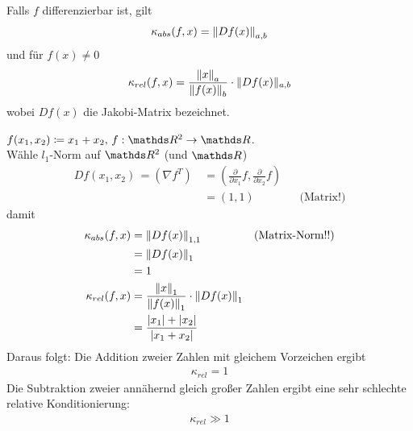 \begin{Leme}\label{3.2.8}
  Falls $f$ differenzierbar ist, gilt
  \begin{gather}
    \kappa_{abs}(f,x) = \left\| Df(x) \right\|_{a,b} \label{III.2.4}
  \end{gather}
  und für $f(x) \neq 0$
  \begin{gather}
    \kappa_{rel}(f,x) = \frac{\left\| x \right\|_a}{\left\| f(x) \right\|_b}\cdot \|Df(x)\|_{a,b} \label{III.2.5}
  \end{gather}
  wobei $Df(x)$ die Jakobi-Matrix bezeichnet.
\end{Leme}

\begin{Bspe}
  \label{3.2.9} 
  $f(x_1, x_2) \coloneqq x_1 +x_2 , \, f:\R^2 \rightarrow \R$. \\
  Wähle $l_1$-Norm auf $\R^2$ (und $\R$)
  \begin{align*}
    Df(x_1, x_2) \, =(\nabla f^T) \, &= (\frac{\partial}{\partial x_1}f, \frac{\partial}{\partial x_2}f )\\
                                     &= (1,1) && \text{(Matrix!)}
  \end{align*}
  damit
  \begin{align*}
    \kappa_{abs} (f,x)&= \left\| Df(x) \right\|_{1,1} && \text{(Matrix-Norm!!)}\\
                      &= \left\| Df(x) \right\|_1 \\
                      &=1 \\
    \kappa_{rel} (f,x) &= \frac{\left\| x \right\|_1}{\left\| f(x) \right\|_1} \cdot \left\| Df(x) \right\|_{1} \\
                      &= \frac{|x_1| + |x_2|}{|x_1+x_2|}
  \end{align*}
  Daraus folgt: Die Addition zweier Zahlen mit gleichem Vorzeichen ergibt
  \begin{gather*}
    \kappa_{rel} = 1
  \end{gather*}
  Die Subtraktion zweier annähernd gleich großer  Zahlen ergibt eine sehr schlechte relative
  Konditionierung:
  \begin{gather*}
    \kappa_{rel} \gg 1
  \end{gather*}
\end{Bspe}

